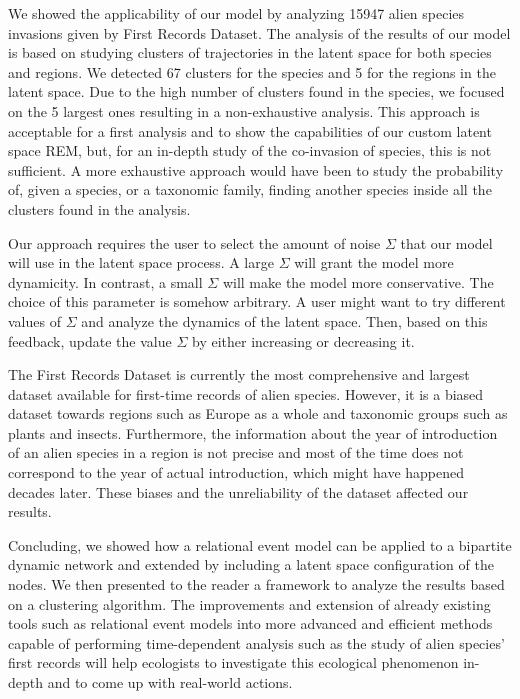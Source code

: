 \documentclass[mscthesis]{usiinfthesis}
\begin{document}
We showed the applicability of our model by analyzing 15947 alien species invasions given by First Records Dataset. The analysis of the results of our model is based on studying clusters of trajectories in the latent space for both species and regions. We detected 67 clusters for the species and 5 for the regions in the latent space. Due to the high number of clusters found in the species, we focused on the 5 largest ones resulting in a non-exhaustive analysis. This approach is acceptable for a first analysis and to show the capabilities of our custom latent space REM, but, for an in-depth study of the co-invasion of species, this is not sufficient. A more exhaustive approach would have been to study the probability of, given a species, or a taxonomic family, finding another species inside all the clusters found in the analysis. 
 
Our approach requires the user to select the amount of noise $\Sigma$ that our model will use in the latent space process. A large $\Sigma$ will grant the model more dynamicity. In contrast, a small $\Sigma$ will make the model more conservative. The choice of this parameter is somehow arbitrary. A user might want to try different values of $\Sigma$ and analyze the dynamics of the latent space. Then, based on this feedback, update the value $\Sigma$ by either increasing or decreasing it. 

The First Records Dataset is currently the most comprehensive and largest dataset available for first-time records of alien species. However, it is a biased dataset towards regions such as Europe as a whole and taxonomic groups such as plants and insects. Furthermore, the information about the year of introduction of an alien species in a region is not precise and most of the time does not correspond to the year of actual introduction, which might have happened decades later. These biases and the unreliability of the dataset affected our results.

Concluding, we showed how a relational event model can be applied to a bipartite dynamic network and extended by including a latent space configuration of the nodes. We then presented to the reader a framework to analyze the results based on a clustering algorithm. The improvements and extension of already existing tools such as relational event models into more advanced and efficient methods capable of performing time-dependent analysis such as the study of alien species' first records will help ecologists to investigate this ecological phenomenon in-depth and to come up with real-world actions. 
\end{document}
